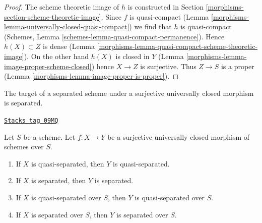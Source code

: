 \begin{proof}

The scheme theoretic image of $h$ is constructed in Section
\ref{morphisms-section-scheme-theoretic-image}. Since $f$ is quasi-compact
(Lemma \ref{morphisms-lemma-universally-closed-quasi-compact})
we find that $h$ is quasi-compact
(Schemes, Lemma \ref{schemes-lemma-quasi-compact-permanence}).
Hence $h(X) \subset Z$
is dense (Lemma \ref{morphisms-lemma-quasi-compact-scheme-theoretic-image}).
On the other hand $h(X)$ is closed in $Y$
(Lemma \ref{morphisms-lemma-image-proper-scheme-closed})
hence $X \to Z$ is surjective.
Thus $Z \to S$ is a proper (Lemma \ref{morphisms-lemma-image-proper-is-proper}).
\end{proof}

The target of a separated scheme under a surjective
universally closed morphism is separated.

\begin{lemma}
\label{morphisms-lemma-image-universally-closed-separated}
\href{https://stacks.math.columbia.edu/tag/09MQ}{\texttt{Stacks tag 09MQ}}

Let $S$ be a scheme. Let $f : X \to Y$ be a surjective universally closed
morphism of schemes over $S$.
\begin{enumerate}
\item If $X$ is quasi-separated, then $Y$ is quasi-separated.
\item If $X$ is separated, then $Y$ is separated.
\item If $X$ is quasi-separated over $S$, then $Y$ is quasi-separated over $S$.
\item If $X$ is separated over $S$, then $Y$ is separated over $S$.
\end{enumerate}
\end{lemma}

